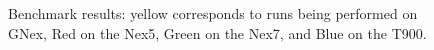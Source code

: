 \begin{figure}
    \caption{Benchmark results: yellow corresponds to runs being performed on GNex, Red on the Nex5, Green on the Nex7, and Blue on the T900.}%
    \label{fig:benchmarks}%
\end{figure}


